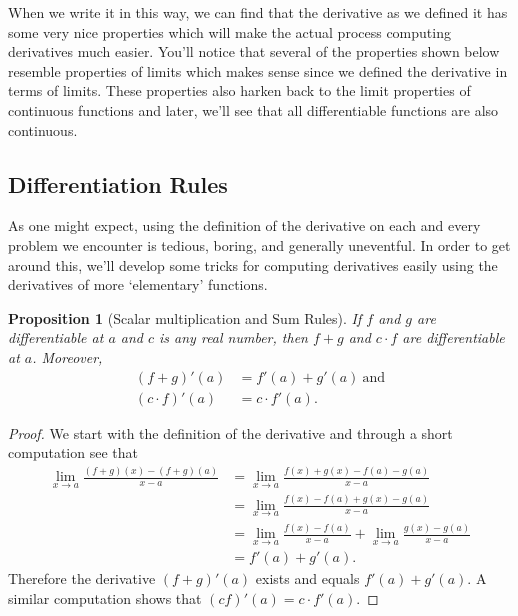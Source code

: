 \documentclass[12pt]{article}
\newtheorem{prop}[thm]{Proposition}
\theoremstyle{definition}
\theoremstyle{plain}
\numberwithin{equation}{section}
\begin{document}
When we write it in this way, we can find that the derivative as we defined it has some very nice properties which will make the actual process computing derivatives much easier. You'll notice that several of the properties shown below resemble properties of limits which makes sense since we defined the derivative in terms of limits. These properties also harken back to the limit properties of continuous functions and later, we'll see that all differentiable functions are also continuous.

\subsection{Differentiation Rules}


As one might expect, using the definition of the derivative on each and every problem we encounter is tedious, boring, and generally uneventful. In order to get around this, we'll develop some tricks for computing derivatives easily using the derivatives of more `elementary' functions.

\begin{prop}[Scalar multiplication and Sum Rules]\label{SMultSumDiff}
	If $f$ and $g$ are differentiable at $a$ and  $c$ is any real number, then $f+g$ and $c\cdot f$ are differentiable at $a$. Moreover,
	\begin{align}
		 (f+g)'(a)&=f'(a)+g'(a)\ \text{and}\\
		  (c\cdot f)'(a)&=c\cdot f'(a).
	\end{align}
\end{prop}
\begin{proof}
We start with the definition of the derivative and through a short computation see that
\begin{align*}
	\lim\limits_{x\to a}\frac{(f+g)(x)-(f+g)(a)}{x-a}&=	\lim\limits_{x\to a}\frac{f(x) +g(x)-f(a)-g(a)}{x-a}\\
	&=\lim\limits_{x\to a}\frac{f(x)-f(a)+g(x)-g(a)}{x-a}\\
	&=\lim\limits_{x\to a}\frac{f(x)-f(a)}{x-a}+\lim\limits_{x\to a}\frac{g(x)-g(a)}{x-a}\\
	&=f'(a)+g'(a).
\end{align*}
Therefore the derivative $(f+g)'(a)$ exists and equals $f'(a)+g'(a)$. A similar computation shows that $(cf)'(a)=c\cdot f'(a)$.
\end{proof}
\end{document}

